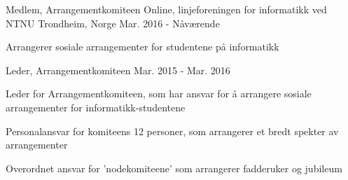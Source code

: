 \begin{cventries}
  \cventry
    {Medlem, Arrangementkomiteen}
    {Online, linjeforeningen for informatikk ved NTNU}
    {Trondheim, Norge}
    {Mar. 2016 - Nåværende}
    {
      \begin{cvitems}
        \item {Arrangerer sosiale arrangementer for studentene på informatikk}
      \end{cvitems}
    }
    \cventry
    {Leder, Arrangementkomiteen}
    {}
    {}
    {Mar. 2015 - Mar. 2016}
    {
      \begin{cvitems}
        \item {Leder for Arrangementkomiteen, som har ansvar for å arrangere sosiale arrangementer for informatikk-studentene}
        \item {Personalansvar for komiteens 12 personer, som arrangerer et bredt spekter av arrangementer}
        \item {Overordnet ansvar for 'nodekomiteene' som arrangerer fadderuker og jubileum}
      \end{cvitems}
    }
    

\end{cventries}
